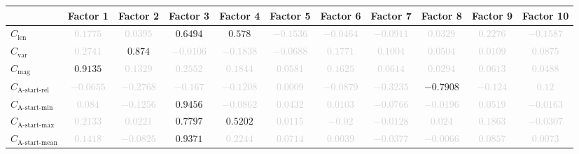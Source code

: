 \documentclass{standalone}
\newcommand{\magnitudename}{\text{mag}}
\newcommand{\magnitude}{C_{\magnitudename}}
\newcommand{\varietyname}{\text{var}}
\newcommand{\variety}{C_{\varietyname}}
\newcommand{\lengthname}{\text{len}}
\newcommand{\length}{C_{\lengthname}}
\newcommand{\startactivitiesrelname}{\text{A-start-rel}}
\newcommand{\startactivitiesrel}{C_{\startactivitiesrelname}}
\newcommand{\startminname}{\text{A-start-min}}
\newcommand{\startmin}{C_{\startminname}}
\newcommand{\startmaxname}{\text{A-start-max}}
\newcommand{\startmax}{C_{\startmaxname}}
\newcommand{\startmeanname}{\text{A-start-mean}}
\newcommand{\startmean}{C_{\startmeanname}}
\begin{document}
\begin{tabular}{lcccccccccc} \toprule 
 & \textbf{Factor 1} & \textbf{Factor 2} & \textbf{Factor 3} & \textbf{Factor 4} & \textbf{Factor 5} & \textbf{Factor 6} & \textbf{Factor 7} & \textbf{Factor 8} & \textbf{Factor 9} & \textbf{Factor 10} \\ \midrule 
$\length$ & \textcolor{lightgray}{$0.1775$} & \textcolor{lightgray}{$0.0395$} & $0.6494$ & $0.578$ & \textcolor{lightgray}{$-0.1536$} & \textcolor{lightgray}{$-0.0464$} & \textcolor{lightgray}{$-0.0911$} & \textcolor{lightgray}{$0.0329$} & \textcolor{lightgray}{$0.2276$} & \textcolor{lightgray}{$-0.1587$} \\ 
$\variety$ & \textcolor{lightgray}{$0.2741$} & $0.874$ & \textcolor{lightgray}{$-0.0106$} & \textcolor{lightgray}{$-0.1838$} & \textcolor{lightgray}{$-0.0688$} & \textcolor{lightgray}{$0.1771$} & \textcolor{lightgray}{$0.1004$} & \textcolor{lightgray}{$0.0504$} & \textcolor{lightgray}{$0.0109$} & \textcolor{lightgray}{$0.0875$} \\ 
$\magnitude$ & $0.9135$ & \textcolor{lightgray}{$0.1329$} & \textcolor{lightgray}{$0.2552$} & \textcolor{lightgray}{$0.1844$} & \textcolor{lightgray}{$0.0581$} & \textcolor{lightgray}{$0.1625$} & \textcolor{lightgray}{$0.0614$} & \textcolor{lightgray}{$0.0294$} & \textcolor{lightgray}{$0.0613$} & \textcolor{lightgray}{$0.0488$} \\ 
$\startactivitiesrel$ & \textcolor{lightgray}{$-0.0655$} & \textcolor{lightgray}{$-0.2768$} & \textcolor{lightgray}{$-0.167$} & \textcolor{lightgray}{$-0.1208$} & \textcolor{lightgray}{$0.0009$} & \textcolor{lightgray}{$-0.0879$} & \textcolor{lightgray}{$-0.3235$} & $-0.7908$ & \textcolor{lightgray}{$-0.124$} & \textcolor{lightgray}{$0.12$} \\ 
$\startmin$ & \textcolor{lightgray}{$0.084$} & \textcolor{lightgray}{$-0.1256$} & $0.9456$ & \textcolor{lightgray}{$-0.0862$} & \textcolor{lightgray}{$0.0432$} & \textcolor{lightgray}{$0.0103$} & \textcolor{lightgray}{$-0.0766$} & \textcolor{lightgray}{$-0.0196$} & \textcolor{lightgray}{$0.0519$} & \textcolor{lightgray}{$-0.0163$} \\ 
$\startmax$ & \textcolor{lightgray}{$0.2133$} & \textcolor{lightgray}{$0.0221$} & $0.7797$ & $0.5202$ & \textcolor{lightgray}{$0.0115$} & \textcolor{lightgray}{$-0.02$} & \textcolor{lightgray}{$-0.0128$} & \textcolor{lightgray}{$0.024$} & \textcolor{lightgray}{$0.1863$} & \textcolor{lightgray}{$-0.0307$} \\ 
$\startmean$ & \textcolor{lightgray}{$0.1418$} & \textcolor{lightgray}{$-0.0825$} & $0.9371$ & \textcolor{lightgray}{$0.2244$} & \textcolor{lightgray}{$0.0714$} & \textcolor{lightgray}{$0.0039$} & \textcolor{lightgray}{$-0.0377$} & \textcolor{lightgray}{$-0.0066$} & \textcolor{lightgray}{$0.0857$} & \textcolor{lightgray}{$0.0073$} \\ 

\end{tabular}
\end{document}
